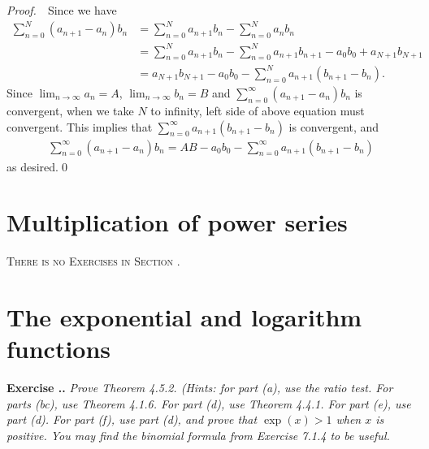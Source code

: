\documentclass{book}
\newcommand{\pff}{\vspace{.25em}\noindent\emph{Proof.}~~}
\newcounter{Exercise}[section]
\renewcommand{\theExercise}{\thesection.\arabic{Exercise}.}
\newcommand{\new}{\vspace{1.5em}\noindent\textbf{Exercise \stepcounter{Exercise}\textbf{\theExercise}} }
\begin{document}
\pff Since we have
    \begin{align*}
        \sum_{n = 0}^{N} (a_{n + 1} - a_n)b_n
        &= \sum_{n = 0}^{N} a_{n + 1}b_n - \sum_{n = 0}^{N} a_nb_n\\
        &= \sum_{n = 0}^{N} a_{n + 1}b_n - \sum_{n = 0}^{N} a_{n + 1}b_{n + 1} - a_0b_0 + a_{N + 1}b_{N + 1}\\
        &= a_{N + 1}b_{N + 1} - a_0b_0 - \sum_{n = 0}^{N} a_{n + 1}(b_{n + 1} - b_{n}).
    \end{align*}
Since $\lim_{n \to \infty} a_n = A$, $\lim_{n \to \infty} b_n = B$ and $\sum_{n = 0}^{\infty} (a_{n + 1} - a_n)b_n$ is convergent, when we take $N$ to infinity, left side of above equation must convergent. This implies that $\sum_{n = 0}^{\infty} a_{n + 1}(b_{n + 1} - b_{n})$ is convergent, and
    \begin{align*}
        \sum_{n = 0}^{\infty} (a_{n + 1} - a_n)b_n 
        = AB - a_0b_0 - \sum_{n = 0}^{\infty} a_{n + 1}(b_{n + 1} - b_n)
    \end{align*}
as desired.\qed

\section{Multiplication of power series}
\begin{center}
    \textsc{There is no Exercises in Section \thesection.}
\end{center}

\section{The exponential and logarithm functions}

\new\emph{Prove Theorem 4.5.2. (Hints: for part (a), use the ratio test.
For parts (bc), use Theorem 4.1.6. For part (d), use Theorem 4.4.1. For part (e), use part (d). For part (f), use part (d), and prove that $\exp(x) > 1$ when $x$ is positive. You may find the binomial formula from Exercise 7.1.4 to be useful.}
\end{document}
